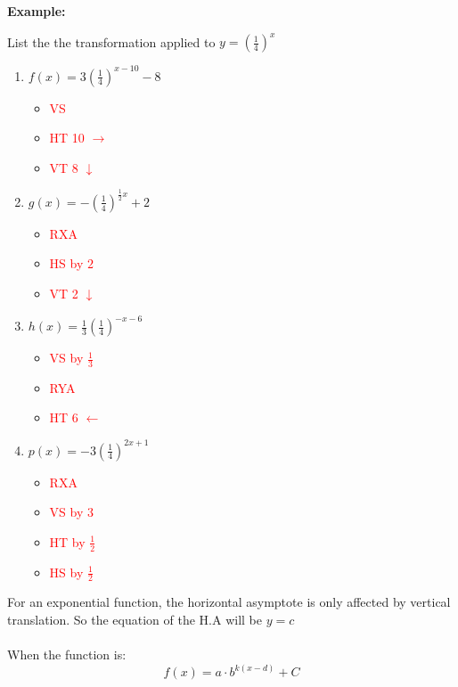 \documentclass[12pt,a4paper]{article}
\newenvironment{example}
  {\begin{framed}\colorbox{examplecolor}{
  \parbox{\dimexpr\linewidth-2\fboxsep}{
  \textbf{Example:}}}}
  {\end{framed}}
\begin{document}
\newpage
\begin{example}
    List the the transformation applied to \(y=\left(\frac{1}{4}\right)^x\)
    \begin{enumerate}
        \item $f(x)=3 \left( \frac{1}{4}\right)^{x-10}-8$
    \begin{itemize}
    \item \textcolor{red}{VS}
    \item \textcolor{red}{HT 10 \(\to\)}
    \item \textcolor{red}{VT 8 \(\downarrow\)}
    \end{itemize}  
    \item $g(x)=-\left(\frac{1}{4} \right)^{\frac{1}{2}x}+2$
    \begin{itemize}
    \item \textcolor{red}{RXA}
    \item \textcolor{red}{HS by \(2\)}
    \item \textcolor{red}{VT 2 \(\downarrow\)}
    \end{itemize}     
    \item $h(x)=\frac{1}{3}\left(\frac{1}{4}\right)^{-x-6}$
    \begin{itemize}
    \item \textcolor{red}{VS by \(\frac{1}{3}\)}
    \item \textcolor{red}{RYA}
    \item \textcolor{red}{HT 6 \(\gets\)}
    \end{itemize}       
    \item $p(x)=-3\left( \frac{1}{4}\right)^{2x+1}$
    \begin{itemize}
    \item \textcolor{red}{RXA}
    \item \textcolor{red}{VS by 3}
    \item \textcolor{red}{HT by \(\frac{1}{2}\)}
    \item \textcolor{red}{HS by \(\frac{1}{2}\)}
    \end{itemize}    
    \end{enumerate}
\end{example}
\newpage 
For an exponential function, the horizontal asymptote is only affected by vertical translation. So the equation of the H.A will be $y=c$ \\ \\
When the function is: \\ 
\begin{equation*}
f(x)=a\cdot b^{k(x-d)}+C    
\end{equation*}
\end{document}
